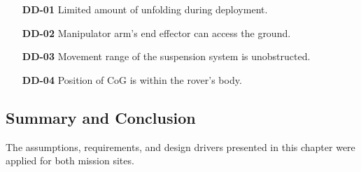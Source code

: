 \begin{itemize}
    \item[\textbf{DD-01}] Limited amount of unfolding during deployment.
    \item[\textbf{DD-02}] Manipulator arm's end effector can access the ground.
    \item[\textbf{DD-03}] Movement range of the suspension system is unobstructed.
    \item[\textbf{DD-04}] Position of \ac{CoG} is within the rover's body.
\end{itemize}

\subsection{Summary and Conclusion}
\label{sec:RequirementsAndDesignDrivers:SummaryAndConclusion}
The assumptions, requirements, and design drivers presented in this chapter were applied for both mission sites.
